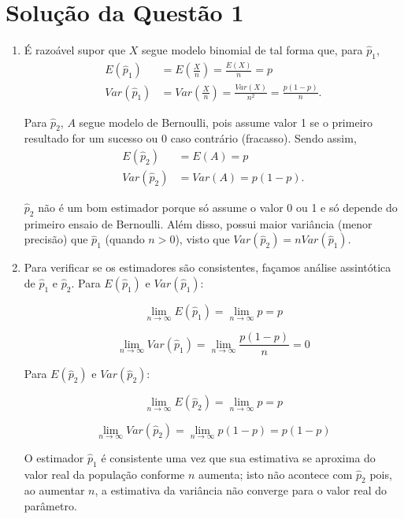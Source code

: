 \documentclass[
	12pt,				%
	openright,			%
	oneside,			%
	a4paper,			%
	english,			%
	brazil,				%
	]{abntex2}
\begin{document}
\imprimircapa
\textual

\section{Solução da Questão 1}
\begin{enumerate}[label=\alph*)]
    \item É razoável supor que $X$ segue modelo binomial de tal forma que, para $\hat{p}_1$,
    \begin{align*}
    E(\hat{p}_1) &= E\left(\frac{X}{n}\right) = \frac{E(X)}{n} = p\\
    Var(\hat{p}_1) &= Var\left(\frac{X}{n}\right) = \frac{Var(X)}{n^2} = \frac{p(1 - p)}{n}.
    \end{align*}
    
    Para $\hat{p}_2$, $A$ segue modelo de Bernoulli, pois assume valor 1 se o primeiro resultado for um sucesso ou 0 caso contrário (fracasso). Sendo assim,
    \begin{align*}
    E(\hat{p}_2) &= E(A) = p\\
    Var(\hat{p}_2) &= Var(A) = p(1 - p).
    \end{align*}
    
    $\hat{p}_2$ não é um bom estimador porque só assume o valor 0 ou 1 e só depende do primeiro ensaio de Bernoulli. Além disso, possui maior variância (menor precisão) que $\hat{p}_1$ (quando $n > 0$), visto que $Var(\hat{p}_2) = nVar(\hat{p}_1)$.
    
    
    \item Para verificar se os estimadores são consistentes, façamos análise assintótica de $\hat{p}_1$ e $\hat{p}_2$. Para $E(\hat{p}_1)$ e $Var(\hat{p}_1)$:
    
    $$\lim_{n \to \infty} E(\hat{p}_1) = \lim_{n \to \infty} p = p$$
    
    $$\lim_{n \to \infty} Var(\hat{p}_1) = \lim_{n \to \infty} \frac{p(1 - p)}{n} = 0$$
    
    Para $E(\hat{p}_2)$ e $Var(\hat{p}_2)$:
    
    $$\lim_{n \to \infty} E(\hat{p}_2) = \lim_{n \to \infty} p = p$$
    
    $$\lim_{n \to \infty} Var(\hat{p}_2) = \lim_{n \to \infty} p(1 - p) = p(1 - p)$$
    
    O estimador $\hat{p}_1$ é consistente uma vez que sua estimativa se aproxima do valor real da população conforme $n$ aumenta; isto não acontece com $\hat{p}_2$ pois, ao aumentar $n$, a estimativa da variância não converge para o valor real do parâmetro. %
\end{enumerate}
\end{document}
